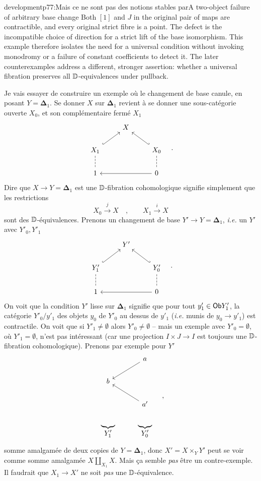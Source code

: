 \begin{dcomment}{development}{p77:Mais ce ne sont pas des notions stables par}{A two-object failure of arbitrary base change}
Both $[1]$ and $J$ in the original pair of maps are contractible, and every original strict fibre is a point. The defect is the incompatible choice of direction for a strict lift of the base isomorphism. This example therefore isolates the need for a universal condition without invoking monodromy or a failure of constant coefficients to detect it. The later counterexamples address a different, stronger assertion: whether a universal fibration preserves all $\mathbb{D}$-equivalences under pullback.
\end{dcomment}


\hspace*{\parindent}Je vais essayer de construire un exemple où le changement de base canule, en posant $Y = \boldsymbol{\Delta}_1$. Se donner $X$ sur $\boldsymbol{\Delta}_1$ revient à se donner une sous-catégorie ouverte $X_0$, et son complémentaire fermé $X_1$
\[
\begin{tikzcd}
& X & \\
X_1 \arrow[ur, hook] \arrow[d, dash, dashed] & & X_0 \arrow[ul, hook'] \arrow[d, dash, dashed] \\
1 & & 0 \arrow[ll]
\end{tikzcd}
\quad .
\]
Dire que $X \to Y = \boldsymbol{\Delta}_1$ est une $\mathbb{D}$-fibration cohomologique signifie simplement
que les restrictions
\[
X_0 \overset{j}{\longrightarrow} X \quad , \qquad X_1 \overset{i}{\longrightarrow} X
\]
sont des $\mathbb{D}$-équivalences. Prenons un changement de base $Y' \to Y = \boldsymbol{\Delta}_1$, \textit{i.e.} un $Y'$ avec $Y'_0, Y'_1$
\[
\begin{tikzcd}
& Y' & \\
Y'_1 \arrow[ur, hook] \arrow[d, dash, dashed] & & Y'_0 \arrow[ul, hook'] \arrow[d, dash, dashed] \\
1 & & 0 \arrow[ll]
\end{tikzcd}
\quad .
\]
On voit que la condition $Y'$ lisse sur $\boldsymbol{\Delta}_1$ signifie que pour tout $y'_1 \in \mathsf{Ob} Y'_1$, la catégorie $Y'_0/y'_1$ des objets $y_0$ de $Y'_0$ au dessus de $y'_1$ (\textit{i.e.} munis de $y_0 \to y'_1$) est contractile. On voit que si $Y'_1 \neq \emptyset$ alors $Y'_0 \neq \emptyset$ -- mais un exemple avec $Y'_0 = \emptyset$, où $Y'_1 = \emptyset$, n'est pas intéressant
(car une projection $I \times J \to I$ est toujours une $\mathbb{D}$-fibration cohomologique). Prenons par exemple pour $Y'$
\[
\begin{tikzcd}
& a \arrow[dl] \\
b & \\
& a' \arrow[ul] \\
\underbrace{\qquad}_{\displaystyle Y'_1} & \underbrace{\qquad}_{\displaystyle Y'_0}
\end{tikzcd}
\quad ,
\]
somme amalgamée de deux copies de $Y = \boldsymbol{\Delta}_1$, donc $X' = X \times_Y Y'$ peut se voir comme somme amalgamée $X \amalg_{X_1} X$. Mais ça semble \textit{pas} être un contre-exemple. Il faudrait que $X_1 \to X'$ ne soit \textit{pas} une $\mathbb{D}$-équivalence.

